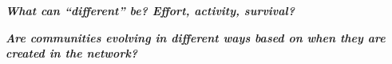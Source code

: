 

\textbf{\textit{What can ``different'' be? Effort, activity, survival?}}


\textbf{\textit{Are communities evolving in different ways based on when they are created in the network?}}


